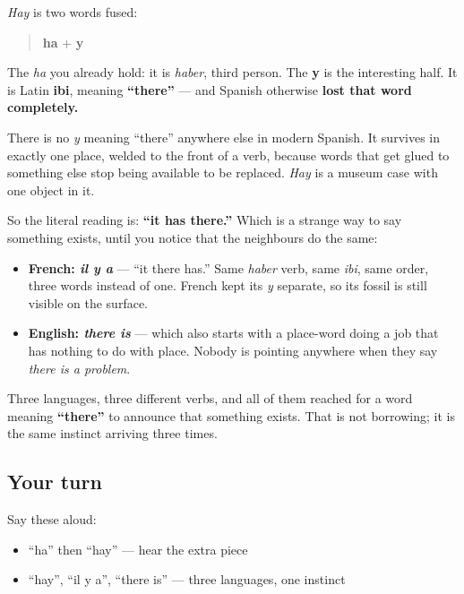 \begin{cousinweb}
\emph{Hay} is two words fused:

\begin{quote}
\textbf{ha} + \textbf{y}
\end{quote}

The \emph{ha} you already hold: it is \emph{haber}, third person. The \textbf{y} is the interesting half. It is Latin \textbf{ibi}, meaning \textbf{\textquotedblleft{}there\textquotedblright{}} — and Spanish otherwise \textbf{lost that word completely.}

There is no \emph{y} meaning \textquotedblleft{}there\textquotedblright{} anywhere else in modern Spanish. It survives in exactly one place, welded to the front of a verb, because words that get glued to something else stop being available to be replaced. \emph{Hay} is a museum case with one object in it.

So the literal reading is: \textbf{\textquotedblleft{}it has there.\textquotedblright{}} Which is a strange way to say something exists, until you notice that the neighbours do the same:

\begin{itemize}
\raggedright
  \item \textbf{French: \emph{il y a}} — \textquotedblleft{}it there has.\textquotedblright{} Same \emph{haber} verb, same \emph{ibi}, same order, three words instead of one. French kept its \emph{y} separate, so its fossil is still visible on the surface.
  \item \textbf{English: \emph{there is}} — which also starts with a place-word doing a job that has nothing to do with place. Nobody is pointing anywhere when they say \emph{there is a problem}.
\end{itemize}

Three languages, three different verbs, and all of them reached for a word meaning \textbf{\textquotedblleft{}there\textquotedblright{}} to announce that something exists. That is not borrowing; it is the same instinct arriving three times.
\end{cousinweb}

\subsection*{Your turn}
Say these aloud:

\begin{itemize}
\raggedright
  \item \textquotedblleft{}ha\textquotedblright{} then \textquotedblleft{}hay\textquotedblright{} — hear the extra piece
  \item \textquotedblleft{}hay\textquotedblright{}, \textquotedblleft{}il y a\textquotedblright{}, \textquotedblleft{}there is\textquotedblright{} — three languages, one instinct
\end{itemize}


